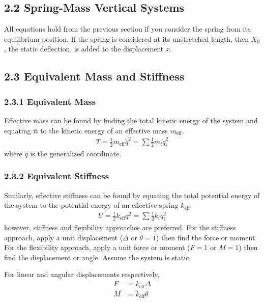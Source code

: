 \begin{multicols*}{2}
\subsection{2.2 Spring-Mass Vertical Systems}
All equations hold from the previous section if you consider the spring from its equilibrium position. If the spring is considered at its unstretched length, then $X_0$, the static deflection, is added to the displacement $x$.

\subsection{2.3 Equivalent Mass and Stiffness}
\subsubsection{2.3.1 Equivalent Mass}
Effective mass can be found by finding the total kinetic energy of the system and equating it to the kinetic energy of an effective mass $m_{\text{eff}}$.
\begin{align*}
    T = \frac{1}{2}m_{\text{eff}}\dot{q}^2 = \sum \frac{1}{2}m_i\dot{q}_i^2
\end{align*}
where $q$ is the generalized coordinate.

\subsubsection{2.3.2 Equivalent Stiffness}
Similarly, effective stiffness can be found by equating the total potential energy of the system to the potential energy of an effective spring $k_{\text{eff}}$.
\begin{align*}
    U = \frac{1}{2}k_{\text{eff}}q^2 = \sum \frac{1}{2}k_iq_i^2
\end{align*}
however, stiffness and flexibility approaches are preferred. For the stiffness approach, apply a unit displacement ($\Delta$ or $\theta = 1$) then find the force or moment. For the flexibility approach, apply a unit force or moment ($F = 1$ or $M = 1$) then find the displacement or angle. Assume the system is static. 

For linear and angular displacements respectively,
\begin{align*}
    F &= k_{\text{eff}} \Delta \\
    M &= k_{\text{eff}} \theta
\end{align*}


\end{multicols*}